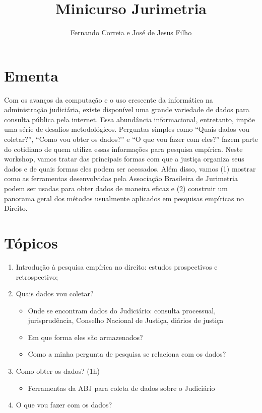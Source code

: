 \documentclass[12pt]{article}
\title{Minicurso Jurimetria}
\author{Fernando Correia e José de Jesus Filho}
\providecommand{\tightlist}{%
  \setlength{\itemsep}{0pt}\setlength{\parskip}{0pt}}
\begin{document}
\maketitle

\thispagestyle{fancy}

{
\hypersetup{linkcolor=black}
\setcounter{tocdepth}{2}
\tableofcontents
}
\section{Ementa}\label{ementa}

Com os avanços da computação e o uso crescente da informática na
administração judiciária, existe disponível uma grande variedade de
dados para consulta pública pela internet. Essa abundância
informacional, entretanto, impõe uma série de desafios metodológicos.
Perguntas simples como ``Quais dados vou coletar?'', ``Como vou obter os
dados?'' e ``O que vou fazer com eles?'' fazem parte do cotidiano de
quem utiliza essas informações para pesquisa empírica. Neste workshop,
vamos tratar das principais formas com que a justiça organiza seus dados
e de quais formas eles podem ser acessados. Além disso, vamos (1)
mostrar como as ferramentas desenvolvidas pela Associação Brasileira de
Jurimetria podem ser usadas para obter dados de maneira eficaz e (2)
construir um panorama geral dos métodos usualmente aplicados em
pesquisas empíricas no Direito.

\section{Tópicos}\label{topicos}

\begin{enumerate}
\def\labelenumi{\arabic{enumi}.}
\item
  Introdução à pesquisa empírica no direito: estudos prospectivos e
  retrospectivo;
\item
  Quais dados vou coletar?

  \begin{itemize}
  \tightlist
  \item
    Onde se encontram dados do Judiciário: consulta processual,
    jurisprudência, Conselho Nacional de Justiça, diários de justiça
  \item
    Em que forma eles são armazenados?
  \item
    Como a minha pergunta de pesquisa se relaciona com os dados?
  \end{itemize}
\item
  Como obter os dados? (1h)

  \begin{itemize}
  \tightlist
  \item
    Ferramentas da ABJ para coleta de dados sobre o Judiciário
  \end{itemize}
\item
  O que vou fazer com os dados?
\end{enumerate}
\end{document}
